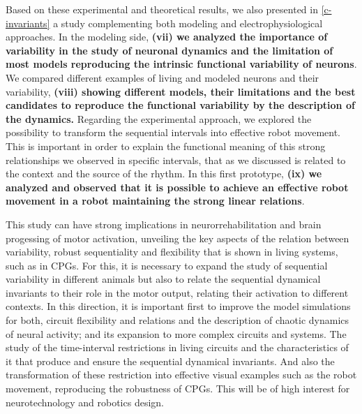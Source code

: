 Based on these experimental and theoretical results, we also presented in \ref{c-invariants} a study complementing both modeling and electrophysiological approaches. In the modeling side, \textbf{(vii) we analyzed the importance of variability in the study of neuronal dynamics and the limitation of most models reproducing the intrinsic functional variability of neurons}. We compared different examples of living and modeled neurons and their variability, \textbf{(viii) showing different models, their limitations and the best candidates to reproduce the functional variability by the description of the dynamics.} Regarding the experimental approach, we explored the possibility to transform the sequential intervals into effective robot movement. This is important in order to explain the functional meaning of this strong relationships we observed in specific intervals, that as we discussed is related to the context and the source of the rhythm. In this first prototype, \textbf{(ix) we analyzed and observed that it is possible to achieve an effective robot movement in a robot maintaining the strong linear relations}.

This study can have strong implications in neurorrehabilitation and brain progessing of motor activation, unveiling the key aspects of the relation between variability, robust sequentiality and flexibility that is shown in living systems, such as in CPGs. For this, it is necessary to expand the study of sequential variability in different animals but also to relate the sequential dynamical invariants to their role in the motor output, relating their activation to different contexts. In this direction, it is important first to improve the model simulations for both, circuit flexibility and relations and the description of chaotic dynamics of neural activity; and its expansion to more complex circuits and systems. The study of the time-interval restrictions in living circuits and the characteristics of it that produce and ensure the sequential dynamical invariants. And also the transformation of these restriction into effective visual examples such as the robot movement, reproducing the robustness of CPGs. This will be of high interest for neurotechnology and robotics design. 

